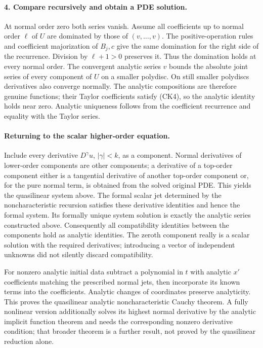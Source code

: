 \begin{expandedproof}
\paragraph{4. Compare recursively and obtain a PDE solution.}
At normal order zero both series vanish.
Assume all coefficients up to normal order $\ell$ of $U$ are
dominated by those of $(v,\ldots,v)$.
The positive-operation rules and coefficient majorization of $B_j,c$
give the same domination for the right side of the recurrence.
Division by $\ell+1>0$ preserves it.
Thus the domination holds at every normal order.
The convergent analytic series $v$ bounds the absolute joint series
of every component of $U$ on a smaller polydisc.
On still smaller polydiscs derivatives also converge normally.
The analytic compositions are therefore genuine functions;
their Taylor coefficients satisfy (CK4), so the analytic identity
holds near zero. Analytic uniqueness follows from the coefficient
recurrence and equality with the Taylor series.
\end{expandedproof}
\Needspace{45mm}

\paragraph{Returning to the scalar higher-order equation.}
Include every derivative $D^\gamma u$, $|\gamma|<k$, as a component.
Normal derivatives of lower-order components are other components;
a derivative of a top-order component either is a tangential derivative
of another top-order component or, for the pure normal term, is obtained
from the solved original PDE.
This yields the quasilinear system above.
The formal scalar jet determined by the noncharacteristic recursion
satisfies these derivative identities and hence the formal system.
Its formally unique system solution is exactly the analytic series
constructed above. Consequently all compatibility identities between
the components hold as analytic identities.
The zeroth component really is a scalar solution with the required
derivatives; introducing a vector of independent unknowns did not
silently discard compatibility.

For nonzero analytic initial data subtract a polynomial in $t$
with analytic $x'$ coefficients matching the prescribed normal jets,
then incorporate its known terms into the coefficients.
Analytic changes of coordinates preserve analyticity.
This proves the quasilinear analytic noncharacteristic Cauchy theorem.
A fully nonlinear version additionally solves its highest normal
derivative by the analytic implicit function theorem and needs the
corresponding nonzero derivative condition; that broader theorem is
a further result, not proved by the quasilinear reduction alone.
\Needspace{45mm}
